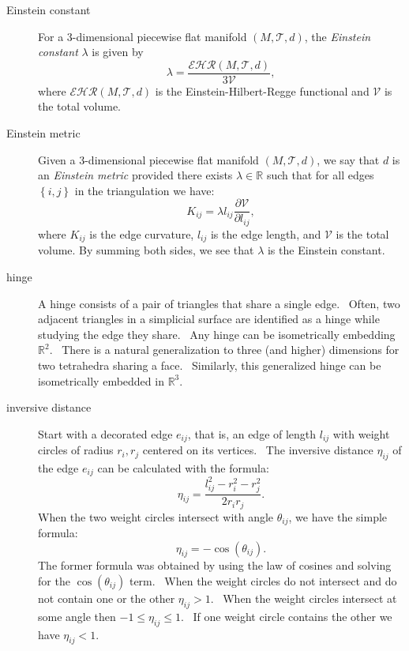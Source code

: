 \begin{description}
\item[Einstein constant] For a 3-dimensional piecewise flat manifold $\left(
M,\mathcal{T},d\right) $, the \textit{Einstein constant} $\lambda $ is given
by%
\[
\lambda =\frac{\mathcal{EHR}\left( M,\mathcal{T},d\right) }{3\mathcal{V}},
\]%
where $\mathcal{EHR}\left( M,\mathcal{T},d\right) $ is the
Einstein-Hilbert-Regge functional and $\mathcal{V}$ is the total volume.

\item[Einstein metric] Given a 3-dimensional piecewise flat manifold $\left(
M,\mathcal{T},d\right) $, we say that $d$ is an \textit{Einstein metric}
provided there exists $\lambda \in \mathbb{R}$ such that for all edges $%
\left\{ i,j\right\} $ in the triangulation we have:%
\[
K_{ij}=\lambda l_{ij}\frac{\partial \mathcal{V}}{\partial l_{ij}},
\]%
where $K_{ij}$ is the edge curvature, $l_{ij}$ is the edge length, and $%
\mathcal{V}$ is the total volume. By summing both sides, we see that $%
\lambda $ is the Einstein constant.

\item[hinge] A hinge consists of a pair of triangles that share a single
edge. \ Often, two adjacent triangles in a simplicial surface are identified
as a hinge while studying the edge they share. \ Any hinge can be
isometrically embedding $%
\mathbb{R}
^{2}$. \ There is a natural generalization to three (and higher) dimensions
for two tetrahedra sharing a face. \ Similarly, this generalized hinge can
be isometrically embedded in $%
\mathbb{R}
^{3}$. \ 

\item[inversive distance] Start with a decorated edge $e_{ij}$, that is, an
edge of length $l_{ij}$ with weight circles of radius $r_{i},r_{j}$ centered
on its vertices. \ The inversive distance $\eta _{ij}$ of the edge $e_{ij}$
can be calculated with the formula:%
\[
\eta _{ij}=\frac{l_{ij}^{2}-r_{i}^{2}-r_{j}^{2}}{2r_{i}r_{j}}.
\]%
When the two weight circles intersect with angle $\theta _{ij}$, we have the
simple formula:%
\[
\eta _{ij}=-\cos \left( \theta _{ij}\right) .
\]%
The former formula was obtained by using the law of cosines and solving for
the $\cos \left( \theta _{ij}\right) $ term. \ When the weight circles do
not intersect and do not contain one or the other $\eta _{ij}>1$. \ When the
weight circles intersect at some angle then $-1\leq \eta _{ij}\leq 1$. \ If
one weight circle contains the other we have $\eta _{ij}<1$. \ 


\end{description}
